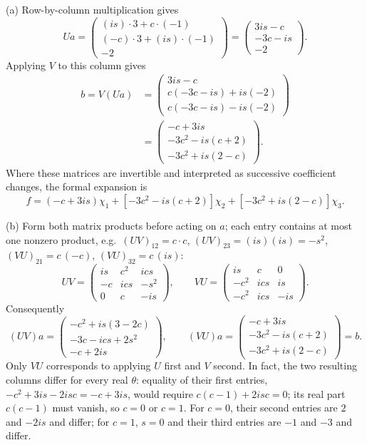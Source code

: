 (a) Row-by-column multiplication gives
\[
Ua=\begin{pmatrix}(is)\cdot3+c\cdot(-1)\\(-c)\cdot3+(is)\cdot(-1)\\-2
\end{pmatrix}
=\begin{pmatrix}3is-c\\-3c-is\\-2\end{pmatrix}.
\]
Applying $V$ to this column gives
\begin{align*}
b=V(Ua)
&=\begin{pmatrix}
3is-c\\c(-3c-is)+is(-2)\\c(-3c-is)-is(-2)
\end{pmatrix}\\
&=\boxed{\begin{pmatrix}
-c+3is\\-3c^2-is(c+2)\\-3c^2+is(2-c)
\end{pmatrix}}.
\end{align*}
Where these matrices are invertible and interpreted as successive
coefficient changes, the formal expansion is
\[
f=(-c+3is)\chi_1+[-3c^2-is(c+2)]\chi_2
                 +[-3c^2+is(2-c)]\chi_3.
\]

(b) Form both matrix products before acting on $a$; each entry contains
at most one nonzero product, e.g.\ $(UV)_{12}=c\cdot c$,
$(UV)_{23}=(is)(is)=-s^2$, $(VU)_{21}=c\,(-c)$,
$(VU)_{32}=c\,(is)$:
\[
UV=\begin{pmatrix}
is&c^2&ics\\-c&ics&-s^2\\0&c&-is
\end{pmatrix},\qquad
VU=\begin{pmatrix}
is&c&0\\-c^2&ics&is\\-c^2&ics&-is
\end{pmatrix}.
\]
Consequently
\[
(UV)a=\begin{pmatrix}
-c^2+is(3-2c)\\-3c-ics+2s^2\\-c+2is
\end{pmatrix},\qquad
(VU)a=\begin{pmatrix}
-c+3is\\-3c^2-is(c+2)\\-3c^2+is(2-c)
\end{pmatrix}=b.
\]
Only $VU$ corresponds to applying $U$ first and $V$ second. In fact,
the two resulting columns differ for every real $\theta$: equality of
their first entries, $-c^2+3is-2isc=-c+3is$, would require
$c(c-1)+2isc=0$; its real part $c(c-1)$ must vanish, so $c=0$ or $c=1$.
For $c=0$, their second entries are $2$ and $-2is$ and differ; for
$c=1$, $s=0$ and their third entries are $-1$ and $-3$ and differ.

